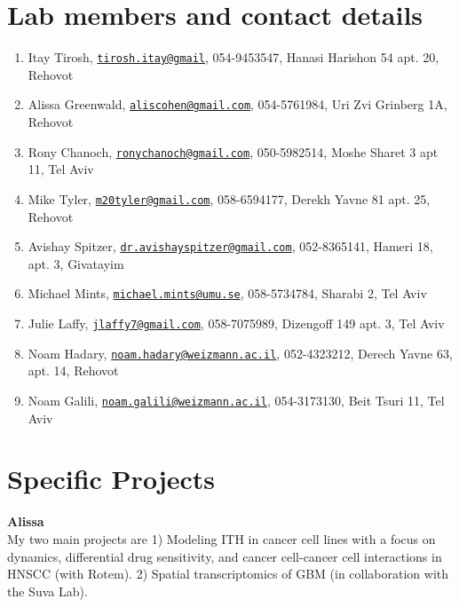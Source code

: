 \documentclass[
]{book}
\providecommand{\tightlist}{%
  \setlength{\itemsep}{0pt}\setlength{\parskip}{0pt}}
\begin{document}
\hypertarget{contact}{%
\chapter{Lab members and contact details}\label{contact}}

\begin{enumerate}
\def\labelenumi{\arabic{enumi}.}
\tightlist
\item
  Itay Tirosh, \href{mailto:tirosh.itay@gmail}{\nolinkurl{tirosh.itay@gmail}}, 054-9453547, Hanasi Harishon 54 apt. 20, Rehovot
\item
  Alissa Greenwald, \href{mailto:aliscohen@gmail.com}{\nolinkurl{aliscohen@gmail.com}}, 054-5761984, Uri Zvi Grinberg 1A, Rehovot
\item
  Rony Chanoch, \href{mailto:ronychanoch@gmail.com}{\nolinkurl{ronychanoch@gmail.com}}, 050-5982514, Moshe Sharet 3 apt 11, Tel Aviv
\item
  Mike Tyler, \href{mailto:m20tyler@gmail.com}{\nolinkurl{m20tyler@gmail.com}}, 058-6594177, Derekh Yavne 81 apt. 25, Rehovot
\item
  Avishay Spitzer, \href{mailto:dr.avishayspitzer@gmail.com}{\nolinkurl{dr.avishayspitzer@gmail.com}}, 052-8365141, Hameri 18, apt. 3, Givatayim
\item
  Michael Mints, \href{mailto:michael.mints@umu.se}{\nolinkurl{michael.mints@umu.se}}, 058-5734784, Sharabi 2, Tel Aviv
\item
  Julie Laffy, \href{mailto:jlaffy7@gmail.com}{\nolinkurl{jlaffy7@gmail.com}}, 058-7075989, Dizengoff 149 apt. 3, Tel Aviv
\item
  Noam Hadary, \href{mailto:noam.hadary@weizmann.ac.il}{\nolinkurl{noam.hadary@weizmann.ac.il}}, 052-4323212, Derech Yavne 63, apt. 14, Rehovot
\item
  Noam Galili, \href{mailto:noam.galili@weizmann.ac.il}{\nolinkurl{noam.galili@weizmann.ac.il}}, 054-3173130, Beit Tsuri 11, Tel Aviv
\end{enumerate}

\hypertarget{projects}{%
\chapter{Specific Projects}\label{projects}}

\textbf{Alissa}\\
My two main projects are 1) Modeling ITH in cancer cell lines with a focus on dynamics, differential drug sensitivity, and cancer cell-cancer cell interactions in HNSCC (with Rotem). 2) Spatial transcriptomics of GBM (in collaboration with the Suva Lab).
\end{document}

